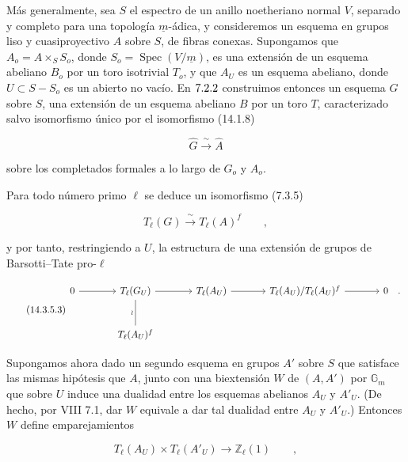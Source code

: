 Más generalmente, sea $S$ el espectro de un anillo noetheriano normal
$V$, separado y completo para una topología $\underline m$-ádica, y
consideremos un esquema en grupos liso y cuasiproyectivo $A$ sobre $S$,
de fibras conexas. Supongamos que
$A_o=A\times_S S_o$, donde
$S_o=\operatorname{Spec}(V/\underline m)$, es una extensión de un
esquema abeliano $B_o$ por un toro isotrivial $T_o$, y que $A_U$ es un
esquema abeliano, donde $U\subset S-S_o$ es un abierto no vacío. En
$\sisi{7.22}{7.2.2}$ construimos entonces un esquema $G$ sobre $S$, una
extensión de un esquema abeliano $B$ por un toro $T$, caracterizado
salvo isomorfismo único por el isomorfismo (14.1.8)

\begin{equation}\tag{14.3.5.1}
 \widehat G\xrightarrow{\ \sim\ }\widehat A
\end{equation}

\noindent
sobre los completados formales a lo largo de $G_o$ y $A_o$.


Para todo número primo $\ell$ se deduce un isomorfismo (7.3.5)

\begin{equation}\tag{14.3.5.2}
 T_\ell(G)\xrightarrow{\ \sim\ }T_\ell(A)^f\qquad ,
\end{equation}

\noindent
y por tanto, restringiendo a $U$, la estructura de una extensión de
grupos de Barsotti--Tate pro-$\ell$

\begin{equation}\tag{14.3.5.3}
\begin{tikzcd}[row sep=large,column sep=large]
0 \arrow[r] & T_\ell(G_U) \arrow[r] \arrow[d,no head,"\wr"']
 & T_\ell(A_U) \arrow[r]
 & T_\ell(A_U)/T_\ell(A_U)^f \arrow[r] & 0\quad .\\
& T_\ell(A_U)^f
\end{tikzcd}
\end{equation}

Supongamos ahora dado un segundo esquema en grupos $A'$ sobre $S$ que
satisface las mismas hipótesis que $A$, junto con una biextensión $W$
de $(A,A')$ por $\mathbb G_m$ que sobre $U$ induce una dualidad entre
los esquemas abelianos $A_U$ y $A'_U$. (De hecho, por VIII 7.1, dar $W$
equivale a dar tal dualidad entre $A_U$ y $A'_U$.) Entonces $W$ define
emparejamientos

\begin{equation}\tag{14.3.5.4}
 T_\ell(A_U)\times T_\ell(A'_U)\longrightarrow\mathbb Z_\ell(1)
 \qquad ,
\end{equation}

